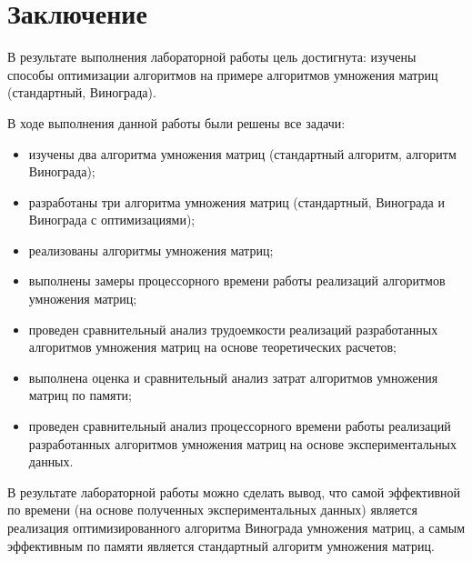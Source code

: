 \chapter*{Заключение}

В результате выполнения лабораторной работы цель достигнута: изучены способы оптимизации алгоритмов на примере алгоритмов умножения матриц (стандартный, Винограда).

В ходе выполнения данной работы были решены все задачи:
\begin{itemize}
    \item изучены два алгоритма умножения матриц (стандартный алгоритм, алгоритм Винограда);
	\item разработаны три алгоритма умножения матриц (стандартный, Винограда и Винограда с оптимизациями);
	\item реализованы алгоритмы умножения матриц;
	\item выполнены замеры процессорного времени работы реализаций алгоритмов умножения матриц;
	\item проведен сравнительный анализ трудоемкости реализаций разработанных алгоритмов умножения матриц на основе теоретических расчетов;
	\item выполнена оценка и сравнительный анализ затрат алгоритмов умножения матриц по памяти; 
	\item проведен сравнительный анализ процессорного времени работы реализаций разработанных алгоритмов умножения матриц на основе экспериментальных данных.
\end{itemize}

В результате лабораторной работы можно сделать вывод, что самой эффективной по времени (на основе полученных экспериментальных данных) является реализация оптимизированного алгоритма Винограда умножения матриц, а самым эффективным по памяти является стандартный алгоритм умножения матриц.